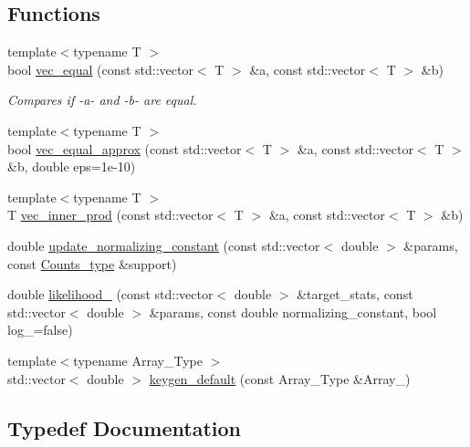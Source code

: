 \subsection*{Functions}
\begin{DoxyCompactItemize}
\item 
{\footnotesize template$<$typename T $>$ }\\bool \hyperlink{namespacebarry_afbdb85734a7793890ea4268ea114858e}{vec\+\_\+equal} (const std\+::vector$<$ T $>$ \&a, const std\+::vector$<$ T $>$ \&b)
\begin{DoxyCompactList}\small\item\em Compares if -\/a-\/ and -\/b-\/ are equal. \end{DoxyCompactList}\item 
{\footnotesize template$<$typename T $>$ }\\bool \hyperlink{namespacebarry_a24c4bd4a99dd82edf66c2d3b645dca08}{vec\+\_\+equal\+\_\+approx} (const std\+::vector$<$ T $>$ \&a, const std\+::vector$<$ T $>$ \&b, double eps=1e-\/10)
\item 
{\footnotesize template$<$typename T $>$ }\\T \hyperlink{namespacebarry_a0343fb4152724d5fa1ffa00d4b6182d9}{vec\+\_\+inner\+\_\+prod} (const std\+::vector$<$ T $>$ \&a, const std\+::vector$<$ T $>$ \&b)
\item 
double \hyperlink{namespacebarry_a822db820c95822d0e7a51728d9b9858d}{update\+\_\+normalizing\+\_\+constant} (const std\+::vector$<$ double $>$ \&params, const \hyperlink{namespacebarry_a3e2d8c3b6cf602107559d4237d9f1315}{Counts\+\_\+type} \&support)
\item 
double \hyperlink{namespacebarry_a1dcc0a46544cc9733ca8ee5619ef6d20}{likelihood\+\_\+} (const std\+::vector$<$ double $>$ \&target\+\_\+stats, const std\+::vector$<$ double $>$ \&params, const double normalizing\+\_\+constant, bool log\+\_\+=false)
\item 
{\footnotesize template$<$typename Array\+\_\+\+Type $>$ }\\std\+::vector$<$ double $>$ \hyperlink{namespacebarry_a22bfc7c4a1f5b5922edfd1101b8ffe3d}{keygen\+\_\+default} (const Array\+\_\+\+Type \&Array\+\_\+)
\end{DoxyCompactItemize}


\subsection{Typedef Documentation}
\mbox{\label{namespacebarry_adc551002e63e38057d304f78d7756308}} 

